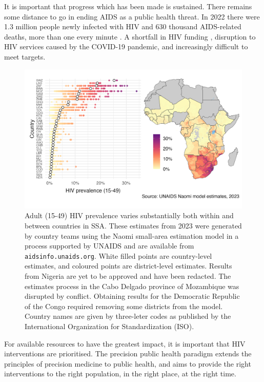 \documentclass[a4paper, nobind]{templates/ociamthesis}
\begin{document}
It is important that progress which has been made is sustained.
There remains some distance to go in ending AIDS as a public health threat.
In 2022 there were 1.3 million people newly infected with HIV and 630 thousand AIDS-related deaths, more than one every minute \autocite{unaids2022global}.
A shortfall in HIV funding \autocite{economist2023triple}, disruption to HIV services caused by the COVID-19 pandemic, and increasingly difficult to meet targets.



\begin{figure}

{\centering \includegraphics[width=0.95\linewidth]{figures/hiv-aids/naomi-continent} 

}

\caption{Adult (15-49) HIV prevalence varies substantially both within and between countries in SSA. These estimates from 2023 were generated by country teams using the Naomi small-area estimation model in a process supported by UNAIDS and are available from \texttt{aidsinfo.unaids.org}. White filled points are country-level estimates, and coloured points are district-level estimates. Results from Nigeria are yet to be approved and have been redacted. The estimates process in the Cabo Delgado province of Mozambique was disrupted by conflict. Obtaining results for the Democratic Republic of the Congo required removing some districts from the model. Country names are given by three-leter codes as published by the International Organization for Standardization (ISO).}\label{fig:naomi-continent}
\end{figure}

For available resources to have the greatest impact, it is important that HIV interventions are prioritised.
The precision public health paradigm \autocite{khoury2016precision} extends the principles of precision medicine to public health, and aims to provide the right interventions to the right population, in the right place, at the right time.
\end{document}
